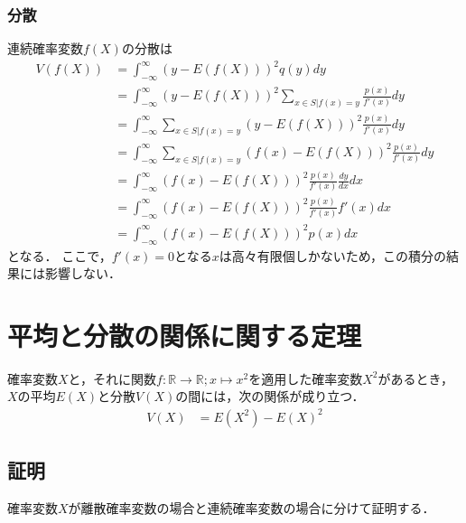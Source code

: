 \documentclass[dvipdfmx]{jsarticle}
\begin{document}
 \subsubsection{分散}
連続確率変数$f\left(X\right)$の分散は
 \begin{align}
  V\left(f\left(X\right)\right)&=\int_{-\infty}^\infty\left(y-E\left(f\left(X\right)\right)\right)^2q\left(y\right)dy\nonumber\\
  &=\int_{-\infty}^\infty\left(y-E\left(f\left(X\right)\right)\right)^2\sum_{x\in S|f\left(x\right)=y}\frac{p\left(x\right)}{f'\left(x\right)}dy\nonumber\\
  &=\int_{-\infty}^\infty\sum_{x\in S|f\left(x\right)=y}\left(y-E\left(f\left(X\right)\right)\right)^2\frac{p\left(x\right)}{f'\left(x\right)}dy\nonumber\\
  &=\int_{-\infty}^\infty\sum_{x\in S|f\left(x\right)=y}\left(f\left(x\right)-E\left(f\left(X\right)\right)\right)^2\frac{p\left(x\right)}{f'\left(x\right)}dy\nonumber\\
  &=\int_{-\infty}^\infty\left(f\left(x\right)-E\left(f\left(X\right)\right)\right)^2\frac{p\left(x\right)}{f'\left(x\right)}\frac{dy}{dx}dx\nonumber\\
  &=\int_{-\infty}^\infty\left(f\left(x\right)-E\left(f\left(X\right)\right)\right)^2\frac{p\left(x\right)}{f'\left(x\right)}f'\left(x\right)dx\nonumber\\
  &=\int_{-\infty}^\infty\left(f\left(x\right)-E\left(f\left(X\right)\right)\right)^2p\left(x\right)dx
 \end{align}
となる．
ここで，$f'\left(x\right)=0$となる$x$は高々有限個しかないため，この積分の結果には影響しない．
 \section{平均と分散の関係に関する定理}
確率変数$X$と，それに関数$f:\mathbb{R}\to\mathbb{R};x\mapsto x^2$を適用した確率変数$X^2$があるとき，$X$の平均$E\left(X\right)$と分散$V\left(X\right)$の間には，次の関係が成り立つ．
 \begin{align}
  V\left(X\right)&=E\left(X^2\right)-E\left(X\right)^2
 \end{align}
 \subsection{証明}
確率変数$X$が離散確率変数の場合と連続確率変数の場合に分けて証明する．
\end{document}
